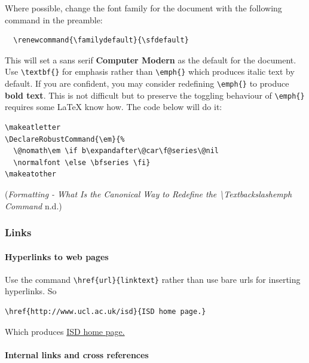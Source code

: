 \documentclass[]{article}
\makeatletter
\renewcommand{\familydefault}{\sfdefault}
\DeclareRobustCommand{\em}{%
  \@nomath\em \if b\expandafter\@car\f@series\@nil
  \normalfont \else \bfseries \fi}
\makeatother
\begin{document}
Where possible, change the font family for the document with the
following command in the preamble:

\begin{verbatim}
  \renewcommand{\familydefault}{\sfdefault}
\end{verbatim}

This will set a sans serif \textbf{Computer Modern} as the default for
the document. Use \texttt{\textbackslash{}textbf\{\}} for emphasis
rather than \texttt{\textbackslash{}emph\{\}} which produces italic text
by default. If you are confident, you may consider redefining
\texttt{\textbackslash{}emph\{\}} to produce \textbf{bold text}. This is
not difficult but to preserve the toggling behaviour of
\texttt{\textbackslash{}emph\{\}} requires some LaTeX know how. The code
below will do it:

\begin{verbatim}
\makeatletter
\DeclareRobustCommand{\em}{%
  \@nomath\em \if b\expandafter\@car\f@series\@nil
  \normalfont \else \bfseries \fi}
\makeatother
\end{verbatim}

(\emph{Formatting - What Is the Canonical Way to Redefine the
\textbackslash{}Textbackslashemph Command} n.d.)

\hypertarget{links}{%
\subsubsection{Links}\label{links}}

\hypertarget{hyperlinks-to-web-pages}{%
\paragraph{Hyperlinks to web pages}\label{hyperlinks-to-web-pages}}

Use the command \texttt{\textbackslash{}href\{url\}\{linktext\}} rather
than use bare urls for inserting hyperlinks. So

\begin{verbatim}
\href{http://www.ucl.ac.uk/isd}{ISD home page.}
\end{verbatim}

Which produces \href{http://www.ucl.ac.uk/isd}{ISD home page.}

\hypertarget{internal-links-and-cross-references}{%
\paragraph{Internal links and cross
references}\label{internal-links-and-cross-references}}
\end{document}
